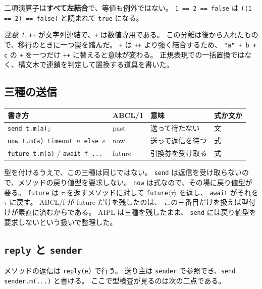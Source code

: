 \documentclass[11pt,a4paper]{ltjsarticle}
\theoremstyle{definition}
\theoremstyle{remark}
\newtheorem{remark}[theorem]{注意}
\begin{document}
二項演算子は\textbf{すべて左結合}で、等値も例外ではない。
\texttt{1 == 2 == false} は \texttt{((1 == 2) == false)} と読まれて \texttt{true} になる。

\begin{remark}
\texttt{++} が文字列連結で、\texttt{+} は数値専用である。
この分離は後から入れたもので、移行のときに一つ罠を踏んだ。
\texttt{+} は \texttt{++} より強く結合するため、
\texttt{"a" + b + c} の \texttt{+} を一つだけ \texttt{++} に替えると意味が変わる。
正規表現での一括置換ではなく、構文木で連鎖を判定して置換する道具を書いた。
\end{remark}

\subsection{三種の送信}
\label{sec:threetypes}

\begin{center}
\begin{tabular}{llll}
\toprule
書き方 & ABCL/1 & 意味 & 式か文か \\
\midrule
\texttt{send t.m(a);}                          & past   & 送って待たない & 文 \\
\texttt{now t.m(a) timeout $n$ else $e$}       & now    & 送って返信を待つ & 式 \\
\texttt{future t.m(a)} / \texttt{await f ...}  & future & 引換券を受け取る & 式 \\
\bottomrule
\end{tabular}
\end{center}

型を付けるうえで、この三種は同じではない。
\texttt{send} は返信を受け取らないので、メソッドの戻り値型を要求しない。
\texttt{now} は式なので、その場に戻り値型が要る。
\texttt{future} は $\tau$ を返すメソッドに対して \texttt{future}$\langle\tau\rangle$ を返し、
\texttt{await} がそれを $\tau$ に戻す。
ABCL/f が future だけを残したのは、
この三番目だけを扱えば型付けが素直に済むからである。
AIPL は三種を残したまま、
\texttt{send} には戻り値型を要求しないという扱いで整理した。

\subsection{\texttt{reply} と \texttt{sender}}

メソッドの返信は \texttt{reply(e)} で行う。
送り主は \texttt{sender} で参照でき、\texttt{send sender.m(...)} と書ける。
ここで型検査が見るのは次の二点である。
\end{document}
